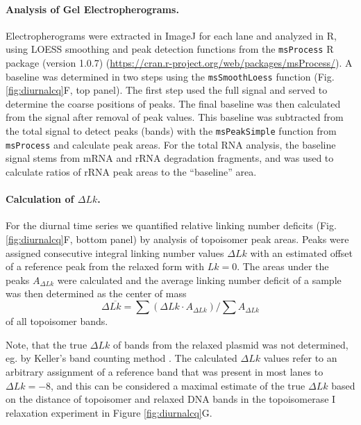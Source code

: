 \documentclass[10pt,letterpaper]{article}
\begin{document}
\paragraph{Analysis of Gel Electropherograms.}
Electropherograms were extracted in ImageJ for each lane and analyzed
in R, using LOESS smoothing and peak detection functions from the
\texttt{msProcess} R package (version 1.0.7)
(\url{https://cran.r-project.org/web/packages/msProcess/}). A baseline
was determined in two steps using the \texttt{msSmoothLoess} function
(Fig. \ref{fig:diurnalcq}F, top panel).  The first step used the full
signal and served to determine the coarse positions of peaks.  The
final baseline was then calculated from the signal after removal of
peak values. This baseline was subtracted from the total signal to
detect peaks (bands) with the \texttt{msPeakSimple} function from
\texttt{msProcess} and calculate peak areas.  For the total RNA
analysis, the baseline signal stems from mRNA and rRNA degradation
fragments, and was used to calculate ratios of rRNA peak areas to the
``baseline'' area.

\paragraph{Calculation of $\Delta Lk$.}
For the diurnal time series we quantified relative linking number
deficits (Fig. \ref{fig:diurnalcq}F, bottom panel) by analysis of
topoisomer peak areas.  Peaks were assigned consecutive
integral linking number values $\Delta Lk$ with an estimated offset of
a reference peak from the relaxed form with $Lk=0$. The areas under
the peaks $A_{\Delta Lk}$ were calculated and the average linking
number deficit of a sample was then determined as the center of mass
\begin{equation}
  \label{eq:dlk}
  \Delta \overline{Lk} = \sum{(\Delta Lk \cdot
    A_{\Delta Lk})}/\sum{A_{\Delta Lk}}
\end{equation}
of all topoisomer bands.

Note, that the true $\Delta Lk$ of bands from the relaxed plasmid was
not determined, eg. by Keller's band counting method
\cite{Keller1975b}.  The calculated $\Delta Lk$ values refer to an
arbitrary assignment of a reference band that was present in most
lanes to $\Delta Lk=-8$, and this can be considered a maximal estimate
of the true $\Delta Lk$ based on the distance of topoisomer and
relaxed DNA bands in the topoisomerase I relaxation experiment in
Figure \ref{fig:diurnalcq}G.


%

\end{document}
